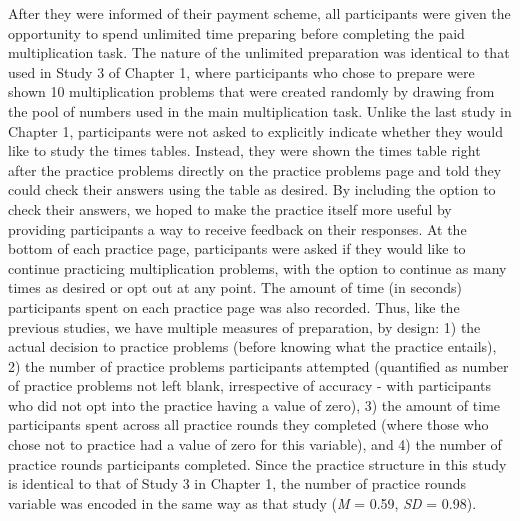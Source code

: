 \documentclass[letterpaper, nobind]{templates/ociamthesis}
\begin{document}
After they were informed of their payment scheme, all participants were given the opportunity to spend unlimited time preparing before completing the paid multiplication task. The nature of the unlimited preparation was identical to that used in Study 3 of Chapter 1, where participants who chose to prepare were shown 10 multiplication problems that were created randomly by drawing from the pool of numbers used in the main multiplication task. Unlike the last study in Chapter 1, participants were not asked to explicitly indicate whether they would like to study the times tables. Instead, they were shown the times table right after the practice problems directly on the practice problems page and told they could check their answers using the table as desired. By including the option to check their answers, we hoped to make the practice itself more useful by providing participants a way to receive feedback on their responses. At the bottom of each practice page, participants were asked if they would like to continue practicing multiplication problems, with the option to continue as many times as desired or opt out at any point. The amount of time (in seconds) participants spent on each practice page was also recorded. Thus, like the previous studies, we have multiple measures of preparation, by design: 1) the actual decision to practice problems (before knowing what the practice entails), 2) the number of practice problems participants attempted (quantified as number of practice problems not left blank, irrespective of accuracy - with participants who did not opt into the practice having a value of zero), 3) the amount of time participants spent across all practice rounds they completed (where those who chose not to practice had a value of zero for this variable), and 4) the number of practice rounds participants completed. Since the practice structure in this study is identical to that of Study 3 in Chapter 1, the number of practice rounds variable was encoded in the same way as that study (\emph{M} = 0.59, \emph{SD} = 0.98).
\end{document}
